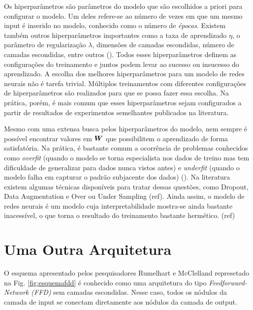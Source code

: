 Os hiperparâmetros são parâmetros do modelo que são escolhidos a priori para configurar o modelo. Um deles refere-se ao número de vezes em que um mesmo input é inserido no modelo, conhecido como o número de \textit{épocas}. Existem também outros hiperparâmetros importantes como a taxa de aprendizado $\eta$, o parâmetro de regularização $\lambda$, dimensões de camadas escondidas, número de camadas escondidas, entre outros (\cite{josh:2017}). Todos esses hiperparâmetros definem as configurações do treinamento e juntos podem levar ao sucesso ou insucesso do aprendizado. A escolha dos melhores hiperparâmetros para um modelo de redes neurais não é tarefa trivial. Múltiplos treinamentos com diferentes configurações de hiperparâmetros são realizados para que se possa fazer essa escolha. Na prática, porém, é mais comum que esses hiperparâmetros sejam configurados a partir de resultados de experimentos semelhantes publicados na literatura.   

Mesmo com uma extensa busca pelos hiperparâmetros do modelo, nem sempre é possível encontrar valores em $\bm{W}$ que possibilitem o aprendizado de forma satisfatória. Na prática, é bastante comum a ocorrência de problemas conhecidos como \textit{overfit} (quando o modelo se torna especialista nos dados de treino mas tem dificuldade de generalizar para dados nunca vistos antes) e \textit{underfit} (quando o modelo falha em capturar o padrão subjacente dos dados) (\cite{josh:2017}). Na literatura existem algumas técnicas disponíveis para tratar dessas questões, como Dropout, Data Augmentation e Over ou Under Sampling (ref). Ainda assim, o modelo de redes neurais é um modelo cuja interpretabilidade mostra-se ainda bastante inacessível, o que torna o resultado do treinamento bastante hermético. (ref)   %

\section{Uma Outra Arquitetura}
\label{sec:arqFDD}
O esquema apresentado pelos pesquisadores Rumelhart e McClelland represetado na Fig. \ref{fig:esquemafdd} é conhecido como uma arquitetura do tipo \textit{Feedforward-Network (FFD)} sem camadas escondidas. Nesse caso, todos os nódulos da camada de input se conectam diretamente aos nódulos da camada de output.

